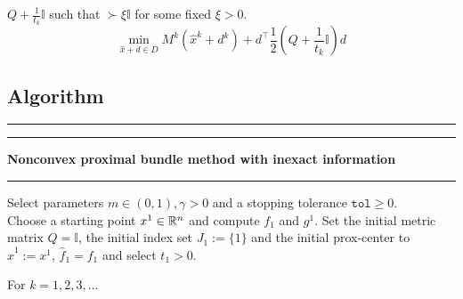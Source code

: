 \(Q+\frac{1}{t_k}\mathbb{I}\) such that \(\succ \xi \mathbb{I}\) for some fixed \(\xi > 0\). \\

\begin{equation}
	\min_{\hat{x}+d \in D} M^k(\hat{x}^k+d^k)+d^{\top}\frac{1}{2}\left(Q+\frac{1}{t_k}\mathbb{I}\right)d	
\label{Q_subprob}
\end{equation}
 

\subsection{Algorithm}
\vspace{1em}

\hrule  \vspace{0.4ex} \hrule
\vspace{1ex}
\textbf{Nonconvex proximal bundle method with inexact information}
\vspace{1ex}
\hrule
\vspace{1ex}
Select parameters \( m \in (0,1), \gamma > 0 \) and a stopping tolerance \( \mathtt{tol} \geq 0\). \\
Choose a starting point \(x^1 \in \mathbb{R}^n\) and compute \(f_1\) and \(g^1\). Set the initial metric matrix \(Q = \mathbb{I}\), the initial index set \(J_1:=\{1\}\) and the initial prox-center to \(\hat{x}^1 := x^1\), \(\hat{f}_1 = f_1\) and select \(t_1 > 0\).

For \(k = 1,2,3,  \dotsc \)   


